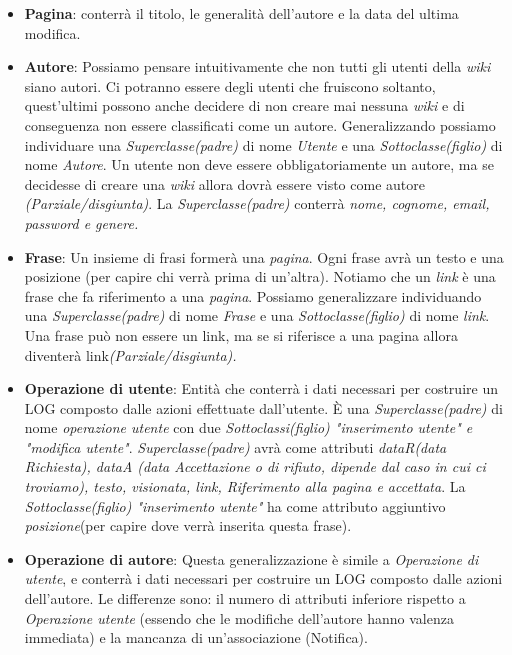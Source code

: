         \begin{itemize}
            \item{\textbf{Pagina}: conterrà il titolo, le generalità dell'autore e la data del ultima modifica.}\newline
            
            \item{\textbf{Autore}: Possiamo pensare intuitivamente che non tutti gli utenti della \textit{wiki} siano autori. Ci potranno essere  degli utenti  che fruiscono soltanto, quest'ultimi possono anche decidere di non creare    mai nessuna \textit{wiki} e di conseguenza non essere classificati come un autore.
              Generalizzando possiamo individuare una \textit{Superclasse(padre)} di nome \textit{Utente} e una \textit{Sottoclasse(figlio)} di nome \textit{Autore}. Un utente non deve essere obbligatoriamente un autore, ma se decidesse di creare una \textit{wiki} allora dovrà essere visto come autore \textit{(Parziale/disgiunta)}. La \textit{Superclasse(padre)} conterrà \textit{nome, cognome, email, password e genere.}} \newline
              
            \item{\textbf{Frase}: Un insieme di frasi formerà una \textit{pagina}. Ogni frase avrà un testo e una posizione (per capire chi verrà prima di un'altra). Notiamo che un \textit{link} è una frase che fa riferimento a una \textit{pagina}. Possiamo generalizzare individuando una \textit{Superclasse(padre)} di nome \textit{Frase} e una \textit{Sottoclasse(figlio)} di nome \textit{link}. Una frase può non essere un link, ma se si riferisce a una pagina allora diventerà link\textit{(Parziale/disgiunta).}} \newline
            
            
            \item{\textbf{Operazione di utente}: Entità che conterrà i dati necessari per costruire un LOG composto dalle azioni effettuate dall'utente. È una \textit{Superclasse(padre)} di nome \textit{operazione utente} con due \textit{Sottoclassi(figlio) "inserimento utente" e "modifica utente"}. \textit{Superclasse(padre)} avrà come attributi \textit{dataR(data Richiesta), dataA (data Accettazione o di rifiuto, dipende dal caso in cui ci troviamo), testo, visionata, link, Riferimento alla pagina e accettata}. La \textit{Sottoclasse(figlio) "inserimento utente"} ha come attributo aggiuntivo \textit{posizione}(per capire dove verrà inserita questa frase).} \newline %

            \item{\textbf{Operazione di autore}: Questa generalizzazione è simile a \textit{Operazione di utente}, e conterrà i dati necessari per costruire un LOG composto dalle azioni dell'autore.
            Le differenze sono: il numero di attributi inferiore rispetto a \textit{Operazione utente} (essendo che le modifiche dell'autore hanno valenza immediata) e la mancanza di un'associazione (Notifica).}\newline
        \end{itemize}
